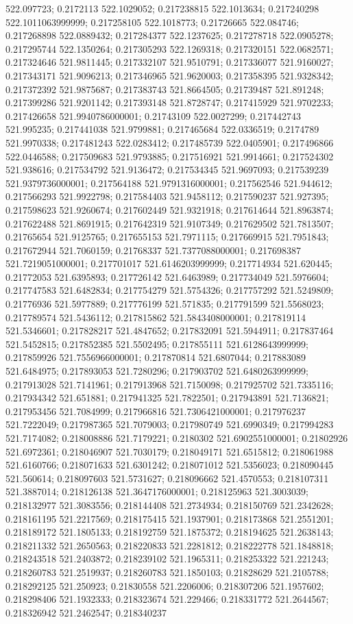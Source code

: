 522.097723; 0.2172113 522.1029052; 0.217238815 522.1013634; 0.217240298 522.1011063999999; 0.217258105 522.1018773; 0.21726665 522.084746; 0.217268898 522.0889432; 0.217284377 522.1237625; 0.217278718 522.0905278; 0.217295744 522.1350264; 0.217305293 522.1269318; 0.217320151 522.0682571; 0.217324646 521.9811445; 0.217332107 521.9510791; 0.217336077 521.9160027; 0.217343171 521.9096213; 0.217346965 521.9620003; 0.217358395 521.9328342; 0.217372392 521.9875687; 0.217383743 521.8664505; 0.21739487 521.891248; 0.217399286 521.9201142; 0.217393148 521.8728747; 0.217415929 521.9702233; 0.217426658 521.9940786000001; 0.21743109 522.0027299; 0.217442743 521.995235; 0.217441038 521.9799881; 0.217465684 522.0336519; 0.2174789 521.9970338; 0.217481243 522.0283412; 0.217485739 522.0405901; 0.217496866 522.0446588; 0.217509683 521.9793885; 0.217516921 521.9914661; 0.217524302 521.938616; 0.217534792 521.9136472; 0.217534345 521.9697093; 0.217539239 521.9379736000001; 0.217564188 521.9791316000001; 0.217562546 521.944612; 0.217566293 521.9922798; 0.217584403 521.9458112; 0.217590237 521.927395; 0.217598623 521.9260674; 0.217602449 521.9321918; 0.217614644 521.8963874; 0.217622488 521.8691915; 0.217642319 521.9107349; 0.217629502 521.7813507; 0.21765654 521.9125765; 0.217655153 521.7971115; 0.217669915 521.7951843; 0.217672944 521.7060159; 0.21768337 521.7377088000001; 0.217698387 521.7219051000001; 0.217701017 521.6146203999999; 0.217714934 521.620445; 0.21772053 521.6395893; 0.217726142 521.6463989; 0.217734049 521.5976604; 0.217747583 521.6482834; 0.217754279 521.5754326; 0.217757292 521.5249809; 0.21776936 521.5977889; 0.217776199 521.571835; 0.217791599 521.5568023; 0.217789574 521.5436112; 0.217815862 521.5843408000001; 0.217819114 521.5346601; 0.217828217 521.4847652; 0.217832091 521.5944911; 0.217837464 521.5452815; 0.217852385 521.5502495; 0.217855111 521.6128643999999; 0.217859926 521.7556966000001; 0.217870814 521.6807044; 0.217883089 521.6484975; 0.217893053 521.7280296; 0.217903702 521.6480263999999; 0.217913028 521.7141961; 0.217913968 521.7150098; 0.217925702 521.7335116; 0.217934342 521.651881; 0.217941325 521.7822501; 0.217943891 521.7136821; 0.217953456 521.7084999; 0.217966816 521.7306421000001; 0.217976237 521.7222049; 0.217987365 521.7079003; 0.217980749 521.6990349; 0.217994283 521.7174082; 0.218008886 521.7179221; 0.2180302 521.6902551000001; 0.21802926 521.6972361; 0.218046907 521.7030179; 0.218049171 521.6515812; 0.218061988 521.6160766; 0.218071633 521.6301242; 0.218071012 521.5356023; 0.218090445 521.560614; 0.218097603 521.5731627; 0.218096662 521.4570553; 0.218107311 521.3887014; 0.218126138 521.3647176000001; 0.218125963 521.3003039; 0.218132977 521.3083556; 0.218144408 521.2734934; 0.218150769 521.2342628; 0.218161195 521.2217569; 0.218175415 521.1937901; 0.218173868 521.2551201; 0.218189172 521.1805133; 0.218192759 521.1875372; 0.218194625 521.2638143; 0.218211332 521.2650563; 0.218220833 521.2281812; 0.218222778 521.1848818; 0.218243518 521.2403872; 0.218239102 521.1965311; 0.218253322 521.221243; 0.218260783 521.2519937; 0.218260783 521.1850103; 0.21828629 521.2105788; 0.218292125 521.250923; 0.21830558 521.2206006; 0.218307206 521.1957602; 0.218298406 521.1932333; 0.218323674 521.229466; 0.218331772 521.2644567; 0.218326942 521.2462547; 0.218340237 